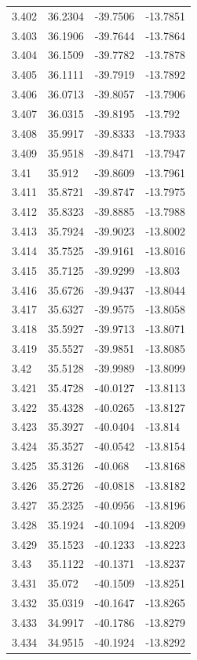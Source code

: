 \begin{tabular}{llll}
3.402 & 36.2304 & -39.7506 & -13.7851 \\
3.403 & 36.1906 & -39.7644 & -13.7864 \\
3.404 & 36.1509 & -39.7782 & -13.7878 \\
3.405 & 36.1111 & -39.7919 & -13.7892 \\
3.406 & 36.0713 & -39.8057 & -13.7906 \\
3.407 & 36.0315 & -39.8195 & -13.792 \\
3.408 & 35.9917 & -39.8333 & -13.7933 \\
3.409 & 35.9518 & -39.8471 & -13.7947 \\
3.41 & 35.912 & -39.8609 & -13.7961 \\
3.411 & 35.8721 & -39.8747 & -13.7975 \\
3.412 & 35.8323 & -39.8885 & -13.7988 \\
3.413 & 35.7924 & -39.9023 & -13.8002 \\
3.414 & 35.7525 & -39.9161 & -13.8016 \\
3.415 & 35.7125 & -39.9299 & -13.803 \\
3.416 & 35.6726 & -39.9437 & -13.8044 \\
3.417 & 35.6327 & -39.9575 & -13.8058 \\
3.418 & 35.5927 & -39.9713 & -13.8071 \\
3.419 & 35.5527 & -39.9851 & -13.8085 \\
3.42 & 35.5128 & -39.9989 & -13.8099 \\
3.421 & 35.4728 & -40.0127 & -13.8113 \\
3.422 & 35.4328 & -40.0265 & -13.8127 \\
3.423 & 35.3927 & -40.0404 & -13.814 \\
3.424 & 35.3527 & -40.0542 & -13.8154 \\
3.425 & 35.3126 & -40.068 & -13.8168 \\
3.426 & 35.2726 & -40.0818 & -13.8182 \\
3.427 & 35.2325 & -40.0956 & -13.8196 \\
3.428 & 35.1924 & -40.1094 & -13.8209 \\
3.429 & 35.1523 & -40.1233 & -13.8223 \\
3.43 & 35.1122 & -40.1371 & -13.8237 \\
3.431 & 35.072 & -40.1509 & -13.8251 \\
3.432 & 35.0319 & -40.1647 & -13.8265 \\
3.433 & 34.9917 & -40.1786 & -13.8279 \\
3.434 & 34.9515 & -40.1924 & -13.8292 \\

\end{tabular}
